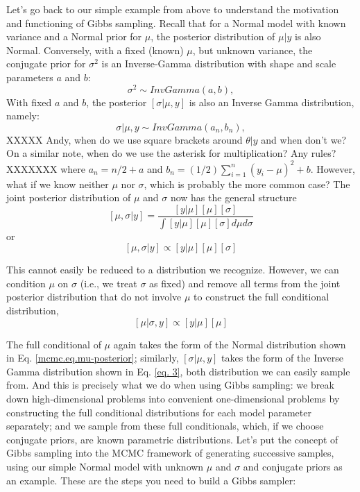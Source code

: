 Let's go back to our
simple example from above to understand the motivation and functioning
of Gibbs sampling. Recall that for a Normal model with known variance
and a Normal prior for $\mu$, the posterior distribution of $\mu|y$ is also
Normal. Conversely, with a fixed (known) $\mu$, but unknown variance, the
conjugate prior for $\sigma^2$ is an Inverse-Gamma distribution with shape and scale parameters $a$ and $b$:
\[
\sigma^2 \sim InvGamma(a,b),
\]
With fixed $a$ and $b$, the posterior $[\sigma|\mu,y]$ is also an Inverse Gamma distribution, namely:
\begin{equation}
\sigma|\mu,y \sim InvGamma (a_n, b_n),
\label{eq. 3}
\end{equation}
XXXXX Andy, when do we use square brackets around $\theta|y$ and when don't we? On a similar note, when do we use the asterisk for multiplication? Any rules? XXXXXXX
 where  $a_n = n/2   + a$ and $b_n = (1/2) \displaystyle\sum\limits_{i=1}^{n} (y_i-\mu)^2 + b$.
However, what if we know neither $\mu$ nor $\sigma$, which is probably the
more common case? The joint posterior distribution of $\mu$ and $\sigma$
now has the general structure
\[
[\mu, \sigma|y] = \frac{[y|\mu] [\mu] [\sigma]}{ \int [y|\mu] [\mu] [\sigma] d\mu d\sigma }
\]
or
\[
[\mu, \sigma|y] \propto [y|\mu] [\mu] [\sigma]
\]

This cannot easily be reduced to a distribution we recognize. However,
we can condition $\mu$ on $\sigma$ (i.e., we treat $\sigma$ as fixed) and remove
all terms from the joint posterior distribution that do not involve $\mu$
to construct the full conditional distribution,
\[
[\mu|\sigma,y]  \propto [y|\mu] [\mu]
\]

The full conditional of $\mu$ again takes the form of the Normal
distribution shown in Eq. \ref{mcmc.eq.mu-posterior}; similarly, $[\sigma|\mu,y]$ takes
the form of the Inverse Gamma distribution shown in
Eq. \ref{eq. 3}, both distribution we can easily sample
from. And this is precisely what we do when using Gibbs sampling: we
break down high-dimensional problems into convenient one-dimensional
problems by constructing the full conditional distributions for each
model parameter separately; and we sample from these full
conditionals, which, if we choose conjugate priors, are known
parametric distributions.
Let's put the concept of Gibbs sampling into the MCMC framework of
generating successive samples, using our simple Normal model with
unknown $\mu$ and $\sigma$ and conjugate priors as an example. These are the
steps you need to build a Gibbs sampler:

